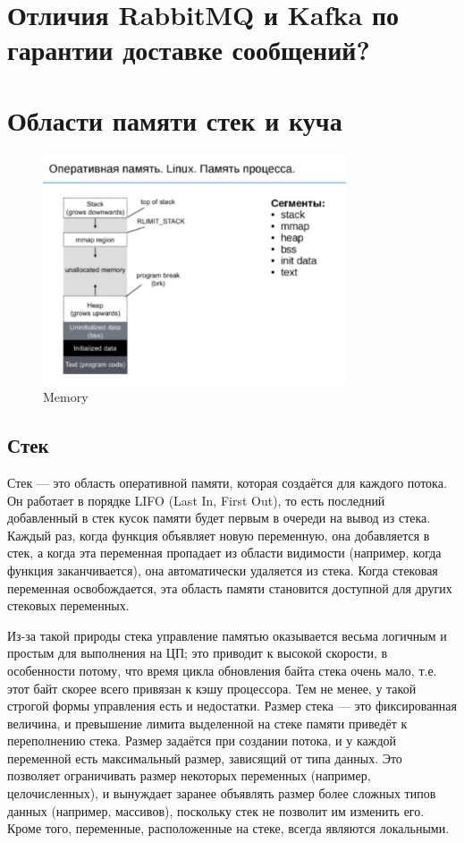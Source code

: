 \section{Отличия RabbitMQ и Kafka по гарантии доставке сообщений?}
\section{Области памяти стек и куча}

\begin{figure}[h!]
\centering
\includegraphics[width=0.8\textwidth]{memory}
\caption{Memory}
\label{memory}
\end{figure}

\subsection{Стек}

Стек — это область оперативной памяти, которая создаётся для каждого потока. Он работает в порядке LIFO (Last In, First Out),  то есть последний добавленный в стек кусок памяти будет первым в очереди на вывод из стека. Каждый раз, когда функция объявляет новую переменную, она добавляется в стек, а когда эта переменная пропадает из области видимости (например, когда функция заканчивается), она автоматически удаляется из стека. Когда стековая переменная освобождается, эта область памяти становится доступной для других стековых переменных.

Из-за такой природы стека управление памятью оказывается весьма логичным и простым для выполнения на ЦП; это приводит к высокой скорости, в особенности потому, что время цикла обновления байта стека очень мало, т.е. этот байт скорее всего привязан к кэшу процессора. Тем не менее, у такой строгой формы управления есть и недостатки. Размер стека — это фиксированная величина, и превышение лимита выделенной на стеке памяти приведёт к переполнению стека. Размер задаётся при создании потока, и у каждой переменной есть максимальный размер, зависящий от типа данных. Это позволяет ограничивать размер некоторых переменных (например, целочисленных), и вынуждает заранее объявлять размер более сложных типов данных (например, массивов), поскольку стек не позволит им изменить его. Кроме того, переменные, расположенные на стеке, всегда являются локальными.

